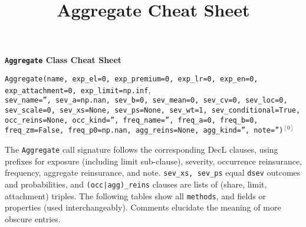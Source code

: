 %
%
%


\title{Aggregate Cheat Sheet}





{\huge{\bf \textbf{\texttt{Aggregate} Class Cheat Sheet}}}

\raggedright
 \texttt{\m Aggregate(name, exp\_el=0, exp\_premium=0, exp\_lr=0, exp\_en=0, exp\_attachment=0, exp\_limit=np.inf}, \\
 \texttt{\phantom{\m}sev\_name='', sev\_a=np.nan, sev\_b=0, sev\_mean=0, sev\_cv=0, sev\_loc=0, sev\_scale=0, sev\_xs=None, sev\_ps=None, sev\_wt=1, sev\_conditional=True, }\\
 \texttt{\phantom{\m}occ\_reins=None, occ\_kind='', freq\_name='', freq\_a=0, freq\_b=0, freq\_zm=False, freq\_p0=np.nan, agg\_reins=None, agg\_kind='', note='')}${}^{[0]}$

The \texttt{Aggregate} call signature follows the corresponding DecL clauses, using prefixes for exposure (including limit sub-clause), severity, occurrence reinsurance, frequency, aggregate reinsurance, and note. \texttt{sev\_xs, sev\_ps} equal \texttt{dsev} outcomes and probabilities, and \texttt{(occ|agg)\_reins} clauses are lists of (share, limit, attachment) triples.
The following tables show all \texttt{\m methods}, and fields or properties (used interchangeably). Comments elucidate the meaning of more obscure entries.


